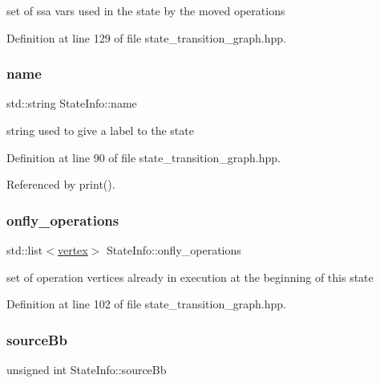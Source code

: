 set of ssa vars used in the state by the moved operations 



Definition at line 129 of file state\+\_\+transition\+\_\+graph.\+hpp.

\mbox{\label{structStateInfo_acb903ffca2d2e1e690a5de8075c115b7}} 
\subsubsection{\texorpdfstring{name}{name}}
{\footnotesize\ttfamily std\+::string State\+Info\+::name}



string used to give a label to the state 



Definition at line 90 of file state\+\_\+transition\+\_\+graph.\+hpp.



Referenced by print().

\mbox{\label{structStateInfo_a06b35ad4218b0bc1e3e952357aa14111}} 
\subsubsection{\texorpdfstring{onfly\+\_\+operations}{onfly\_operations}}
{\footnotesize\ttfamily std\+::list$<$\hyperlink{graph_8hpp_abefdcf0544e601805af44eca032cca14}{vertex}$>$ State\+Info\+::onfly\+\_\+operations}



set of operation vertices already in execution at the beginning of this state 



Definition at line 102 of file state\+\_\+transition\+\_\+graph.\+hpp.

\mbox{\label{structStateInfo_a32780bd5c51bed1b2bed02bb4996a90c}} 
\subsubsection{\texorpdfstring{source\+Bb}{sourceBb}}
{\footnotesize\ttfamily unsigned int State\+Info\+::source\+Bb}



